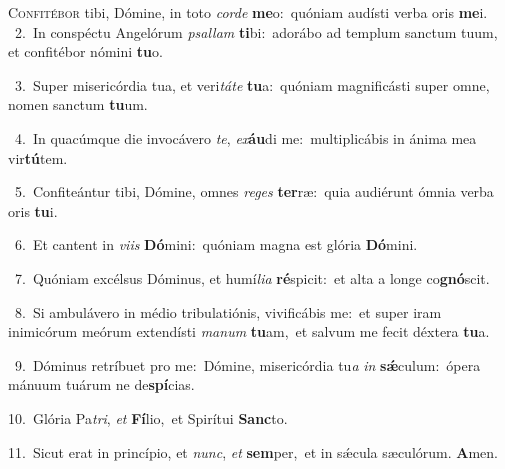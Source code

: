 \lettrine{\initial\textcolor{\initialcolor}{C}}{onfitébor} tibi, Dómine, in toto \textit{cor}\-\textit{de} \textbf{me}\-o:~\star quóniam audísti verba oris \textbf{me}\-i.\\
{\numbfont\textcolor{\numbcolor}{~2.}}~In conspéctu Angelórum \textit{psal}\-\textit{lam} \textbf{ti}\-bi:~\star adorábo ad templum sanctum tuum, et confitébor nómini \textbf{tu}\-o.\par
{\numbfont\textcolor{\numbcolor}{~3.}}~Super misericórdia tua, et veri\-\textit{tá}\-\textit{te} \textbf{tu}\-a:~\star quóniam magnificásti super omne, nomen sanctum \textbf{tu}\-um.\par
{\numbfont\textcolor{\numbcolor}{~4.}}~In quacúmque die invocávero \textit{te}\-, \textit{ex}\-\textbf{áu}di me:~\star multiplicábis in ánima mea vir\-\textbf{tú}\-tem.\par
{\numbfont\textcolor{\numbcolor}{~5.}}~Confiteántur tibi, Dómine, omnes \textit{re}\-\textit{ges} \textbf{ter}\-ræ:~\star quia audiérunt ómnia verba oris \textbf{tu}\-i.\par
{\numbfont\textcolor{\numbcolor}{~6.}}~Et cantent in \textit{vi}\-\textit{is} \textbf{Dó}\-mini:~\star quóniam magna est glória \textbf{Dó}\-mini.\par
{\numbfont\textcolor{\numbcolor}{~7.}}~Quóniam excélsus Dóminus, et humí\-\textit{li}\-\textit{a} \textbf{ré}\-spicit:~\star et alta a longe co\-\textbf{gnó}\-scit.\par
{\numbfont\textcolor{\numbcolor}{~8.}}~Si ambulávero in médio tribulatiónis, vivificábis me:~\dagger et super iram inimicórum meórum extendísti \textit{ma}\-\textit{num} \textbf{tu}\-am,~\star et salvum me fecit déxtera \textbf{tu}\-a.\par
{\numbfont\textcolor{\numbcolor}{~9.}}~Dóminus retríbuet pro me:~\dagger Dómine, misericórdia tu\textit{a} \textit{in} \textbf{sǽ}\-culum:~\star ópera mánuum tuárum ne de\-\textbf{spí}\-cias.\par
{\numbfont\textcolor{\numbcolor}{10.}}~Glória Pa\-\textit{tri}\-, \textit{et} \textbf{Fí}\-lio,~\star et Spirítui \textbf{Sanc}\-to.\par
{\numbfont\textcolor{\numbcolor}{11.}}~Sicut erat in princípio, et \textit{nunc}\-, \textit{et} \textbf{sem}\-per,~\star et in sǽcula sæculórum. \textbf{A}\-men.\par
